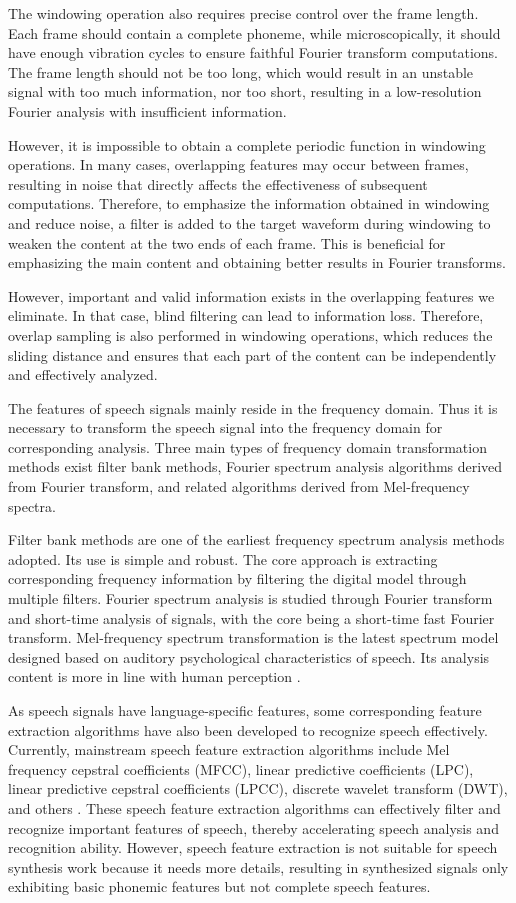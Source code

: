 \documentclass[10pt,journal,compsoc]{IEEEtran}
\begin{document}
The windowing operation also requires precise control over the frame length. Each frame should contain a complete phoneme, while microscopically, it should have enough vibration cycles to ensure faithful Fourier transform computations. The frame length should not be too long, which would result in an unstable signal with too much information, nor too short, resulting in a low-resolution Fourier analysis with insufficient information.

However, it is impossible to obtain a complete periodic function in windowing operations. In many cases, overlapping features may occur between frames, resulting in noise that directly affects the effectiveness of subsequent computations. Therefore, to emphasize the information obtained in windowing and reduce noise, a filter is added to the target waveform during windowing to weaken the content at the two ends of each frame. This is beneficial for emphasizing the main content and obtaining better results in Fourier transforms.

However, important and valid information exists in the overlapping features we eliminate. In that case, blind filtering can lead to information loss. Therefore, overlap sampling is also performed in windowing operations, which reduces the sliding distance and ensures that each part of the content can be independently and effectively analyzed.

The features of speech signals mainly reside in the frequency domain. Thus it is necessary to transform the speech signal into the frequency domain for corresponding analysis. Three main types of frequency domain transformation methods exist filter bank methods, Fourier spectrum analysis algorithms derived from Fourier transform, and related algorithms derived from Mel-frequency spectra.

Filter bank methods are one of the earliest frequency spectrum analysis methods adopted. Its use is simple and robust. The core approach is extracting corresponding frequency information by filtering the digital model through multiple filters. Fourier spectrum analysis is studied through Fourier transform and short-time analysis of signals, with the core being a short-time fast Fourier transform. Mel-frequency spectrum transformation is the latest spectrum model designed based on auditory psychological characteristics of speech. Its analysis content is more in line with human perception \cite{15}.

As speech signals have language-specific features, some corresponding feature extraction algorithms have also been developed to recognize speech effectively. Currently, mainstream speech feature extraction algorithms include Mel frequency cepstral coefficients (MFCC), linear predictive coefficients (LPC), linear predictive cepstral coefficients (LPCC), discrete wavelet transform (DWT), and others \cite{16}. These speech feature extraction algorithms can effectively filter and recognize important features of speech, thereby accelerating speech analysis and recognition ability. However, speech feature extraction is not suitable for speech synthesis work because it needs more details, resulting in synthesized signals only exhibiting basic phonemic features but not complete speech features.
\end{document}
